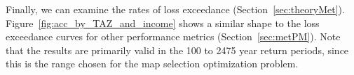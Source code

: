 
Finally, we can examine the rates of loss exceedance (Section~\ref{sec:theoryMet}). Figure~\ref{fig:acc_by_TAZ_and_income} shows a similar shape to the loss exceedance curves for other performance metrics (Section~\ref{sec:metPM}). Note that the results are primarily valid in the 100 to 2475 year return periods, since this is the range chosen for the map selection optimization problem. %

